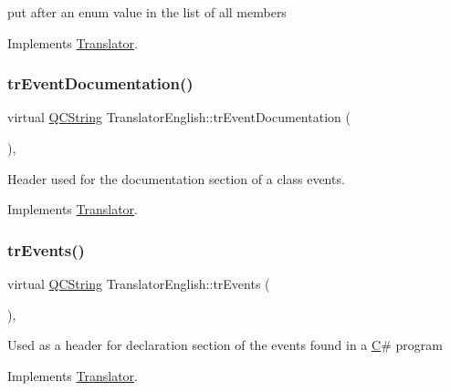put after an enum value in the list of all members 

Implements \mbox{\hyperlink{class_translator}{Translator}}.

\mbox{\label{class_translator_english_a4a2873e27aa4585123526ab99ade704d}} 
\subsubsection{\texorpdfstring{trEventDocumentation()}{trEventDocumentation()}}
{\footnotesize\ttfamily virtual \mbox{\hyperlink{class_q_c_string}{Q\+C\+String}} Translator\+English\+::tr\+Event\+Documentation (\begin{DoxyParamCaption}{ }\end{DoxyParamCaption})\hspace{0.3cm}{\ttfamily [inline]}, {\ttfamily [virtual]}}

Header used for the documentation section of a class\textquotesingle{} events. 

Implements \mbox{\hyperlink{class_translator}{Translator}}.

\mbox{\label{class_translator_english_a384ba4e1fabc92c246096e93b6780c94}} 
\subsubsection{\texorpdfstring{trEvents()}{trEvents()}}
{\footnotesize\ttfamily virtual \mbox{\hyperlink{class_q_c_string}{Q\+C\+String}} Translator\+English\+::tr\+Events (\begin{DoxyParamCaption}{ }\end{DoxyParamCaption})\hspace{0.3cm}{\ttfamily [inline]}, {\ttfamily [virtual]}}

Used as a header for declaration section of the events found in a \mbox{\hyperlink{class_c}{C}}\# program 

Implements \mbox{\hyperlink{class_translator}{Translator}}.

\mbox{\label{class_translator_english_acb393f01a2e8f5a87c899f4a3fb06c9d}} 
